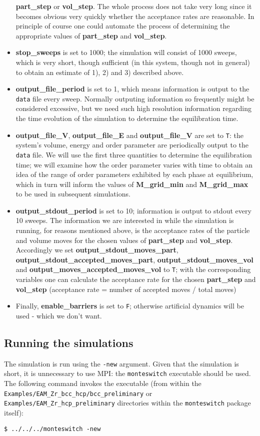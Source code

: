 \documentclass{report}
\begin{document}
\begin{itemize}
  \textbf{part\_step} or \textbf{vol\_step}. The whole process does not take very long since it becomes obvious very quickly whether the acceptance
  rates are reasonable. In principle of course one could automate the process of determining the appropriate values of \textbf{part\_step}
  and \textbf{vol\_step}.
\item \textbf{stop\_sweeps} is set to 1000; the simulation will consist of 1000 sweeps, which is very short, though sufficient (in this system, though
  not in general) to obtain an estimate of 1), 2) and 3) described above. 
\item \textbf{output\_file\_period} is set to 1, which means information is output to the \texttt{data} file every sweep. Normally outputing information
  so frequently might be considered excessive, but we need such high resolution information regarding the time evolution of the simulation to 
  determine the equilibration time.
\item \textbf{output\_file\_V}, \textbf{output\_file\_E} and \textbf{output\_file\_V} are set to \texttt{T}: the system's volume, energy and order parameter 
  are periodically output 
  to the \texttt{data} file. We will use the first three quantities to determine the equilibration time; we will examine how the order parameter
  varies with time to obtain an idea of the range of order parameters exhibited by each phase at equilibrium, which in turn will inform the
  values of \textbf{M\_grid\_min} and \textbf{M\_grid\_max} to be used in subsequent simulations.
\item \textbf{output\_stdout\_period} is set to 10; information is output to stdout every 10 sweeps. The information we are interested in while the simulation
  is running, for reasons mentioned above, is the acceptance rates of the particle and volume moves for the chosen values of \textbf{part\_step} and 
  \textbf{vol\_step}.
  Accordingly we set \textbf{output\_stdout\_moves\_part}, \textbf{output\_stdout\_accepted\_moves\_part}, \textbf{output\_stdout\_moves\_vol} and 
  \textbf{output\_moves\_accepted\_moves\_vol} to \texttt{T}; with the corresponding variables one can calculate the acceptance rate for the chosen
  \textbf{part\_step} and \textbf{vol\_step} (acceptance rate = number of
  accepted moves / total moves)
\item Finally, \textbf{enable\_barriers} is set to \texttt{F}; otherwise artificial dynamics will be used - which we don't want.
\end{itemize}


\subsection{Running the simulations}
The simulation is run using the \texttt{-new} argument. Given that the simulation is short, it is unnecessary to use MPI: the \texttt{monteswitch} executable
should be used. The following command invokes the executable (from within the \texttt{Examples/EAM\_Zr\_bcc\_hcp/bcc\_preliminary} or 
\texttt{Examples/EAM\_Zr\_hcp\_preliminary} directories within the \texttt{monteswitch} package itself):
\begin{verbatim}
$ ../../../monteswitch -new
\end{verbatim}
\end{document}
